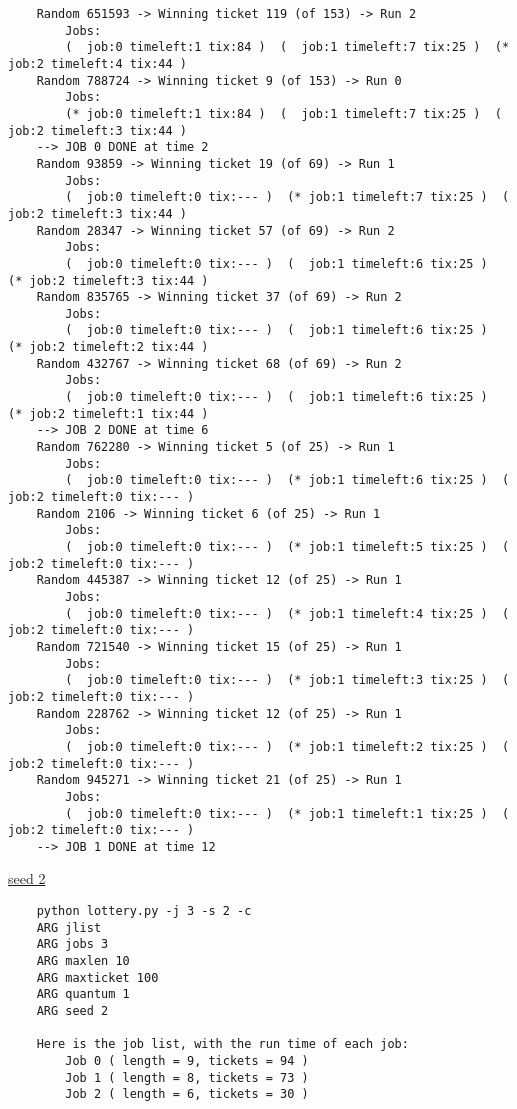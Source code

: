 \documentclass{article}
\begin{document}
\begin{enumerate}
\begin{verbatim}
    Random 651593 -> Winning ticket 119 (of 153) -> Run 2
        Jobs:
        (  job:0 timeleft:1 tix:84 )  (  job:1 timeleft:7 tix:25 )  (* job:2 timeleft:4 tix:44 ) 
    Random 788724 -> Winning ticket 9 (of 153) -> Run 0
        Jobs:
        (* job:0 timeleft:1 tix:84 )  (  job:1 timeleft:7 tix:25 )  (  job:2 timeleft:3 tix:44 ) 
    --> JOB 0 DONE at time 2
    Random 93859 -> Winning ticket 19 (of 69) -> Run 1
        Jobs:
        (  job:0 timeleft:0 tix:--- )  (* job:1 timeleft:7 tix:25 )  (  job:2 timeleft:3 tix:44 ) 
    Random 28347 -> Winning ticket 57 (of 69) -> Run 2
        Jobs:
        (  job:0 timeleft:0 tix:--- )  (  job:1 timeleft:6 tix:25 )  (* job:2 timeleft:3 tix:44 ) 
    Random 835765 -> Winning ticket 37 (of 69) -> Run 2
        Jobs:
        (  job:0 timeleft:0 tix:--- )  (  job:1 timeleft:6 tix:25 )  (* job:2 timeleft:2 tix:44 ) 
    Random 432767 -> Winning ticket 68 (of 69) -> Run 2
        Jobs:
        (  job:0 timeleft:0 tix:--- )  (  job:1 timeleft:6 tix:25 )  (* job:2 timeleft:1 tix:44 ) 
    --> JOB 2 DONE at time 6
    Random 762280 -> Winning ticket 5 (of 25) -> Run 1
        Jobs:
        (  job:0 timeleft:0 tix:--- )  (* job:1 timeleft:6 tix:25 )  (  job:2 timeleft:0 tix:--- ) 
    Random 2106 -> Winning ticket 6 (of 25) -> Run 1
        Jobs:
        (  job:0 timeleft:0 tix:--- )  (* job:1 timeleft:5 tix:25 )  (  job:2 timeleft:0 tix:--- ) 
    Random 445387 -> Winning ticket 12 (of 25) -> Run 1
        Jobs:
        (  job:0 timeleft:0 tix:--- )  (* job:1 timeleft:4 tix:25 )  (  job:2 timeleft:0 tix:--- ) 
    Random 721540 -> Winning ticket 15 (of 25) -> Run 1
        Jobs:
        (  job:0 timeleft:0 tix:--- )  (* job:1 timeleft:3 tix:25 )  (  job:2 timeleft:0 tix:--- ) 
    Random 228762 -> Winning ticket 12 (of 25) -> Run 1
        Jobs:
        (  job:0 timeleft:0 tix:--- )  (* job:1 timeleft:2 tix:25 )  (  job:2 timeleft:0 tix:--- ) 
    Random 945271 -> Winning ticket 21 (of 25) -> Run 1
        Jobs:
        (  job:0 timeleft:0 tix:--- )  (* job:1 timeleft:1 tix:25 )  (  job:2 timeleft:0 tix:--- ) 
    --> JOB 1 DONE at time 12
    \end{verbatim}
    \underline{seed 2}
    \begin{verbatim}
    python lottery.py -j 3 -s 2 -c
    ARG jlist 
    ARG jobs 3
    ARG maxlen 10
    ARG maxticket 100
    ARG quantum 1
    ARG seed 2
    
    Here is the job list, with the run time of each job: 
        Job 0 ( length = 9, tickets = 94 )
        Job 1 ( length = 8, tickets = 73 )
        Job 2 ( length = 6, tickets = 30 )
    

\end{verbatim}
\end{enumerate}
\end{document}

